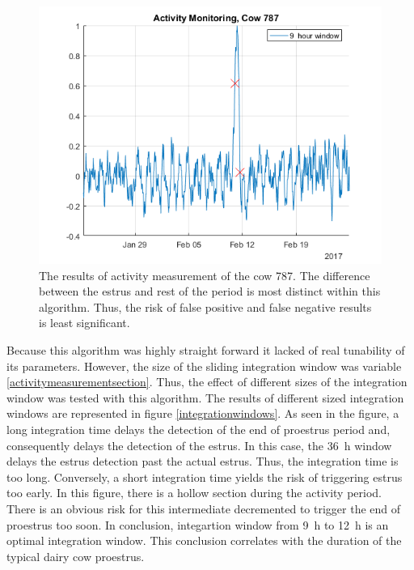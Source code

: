 \documentclass[english,12pt,a4paper,pdftex,elec,utf8]{aaltothesis}
\begin{document}
\begin{figure}[htb]
\centering
\includegraphics[width = 0.75 \textwidth]{figures/ActivityMonitoringCow787.png}
\caption{The results of activity measurement of the cow 787. The difference between the estrus and rest of the period is most distinct within this algorithm. Thus, the risk of false positive and false negative results is least significant.}
\label{ActivityMonitoringCow787}
\end{figure}

Because this algorithm was highly straight forward it lacked of real tunability of its parameters. However, the size of the sliding integration window was variable \ref{activitymeasurementsection}. Thus, the effect of different sizes of the integration window was tested with this algorithm. The results of different sized integration windows are represented in figure \ref{integrationwindows}. As seen in the figure, a long integration time delays the detection of the end of proestrus period and, consequently delays the detection of the estrus. In this case, the \SI{36}{\hour} window delays the estrus detection past the actual estrus. Thus, the integration time is too long. Conversely, a short integration time yields the risk of triggering estrus too early. In this figure, there is a hollow section during the activity period. There is an obvious risk for this intermediate decremented to trigger the end of proestrus too soon. In conclusion, integartion window from \SI{9}{\hour} to \SI{12}{\hour} is an optimal integration window. This conclusion correlates with the duration of the typical dairy cow proestrus.
\end{document}
